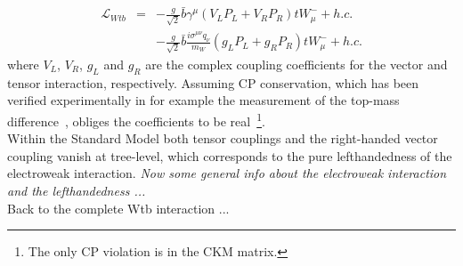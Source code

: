 \begin{eqnarray}
  \mathcal{L}_{Wtb} & = & - \frac{g}{\sqrt{2}} \bar{b} \gamma^{\mu} \left( V_L P_L + V_R P_R \right) t W_{\mu}^{-} + h.c. \nonumber \\
		    &   & - \frac{g}{\sqrt{2}} \bar{b} \frac{i\sigma^{\mu \nu} q_{\nu}}{m_{W}} \left( g_L P_L + g_R P_R \right) t W_{\mu}^{-} + h.c.
\end{eqnarray}
where $V_L$, $V_R$, $g_L$ and $g_R$ are the complex coupling coefficients for the vector and tensor interaction, respectively. Assuming CP conservation, which has been verified experimentally in for example the measurement of the top-mass difference~\cite{}, obliges the coefficients to be real~\footnote{The only CP violation is in the CKM matrix.}.
\\

Within the Standard Model both tensor couplings and the right-handed vector coupling vanish at tree-level, which corresponds to the pure lefthandedness of the electroweak interaction.
\textit{Now some general info about the electroweak interaction and the lefthandedness ...}
\\

Back to the complete Wtb interaction ...

